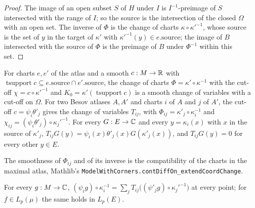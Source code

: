\begin{proof}
\leanok
The image of an open subset $S$ of $H$ under $I$ is $I^{-1}$-preimage of $S$ intersected with
the range of $I$; so the source is the intersection of the closed $\Omega$ with an open set. The
inverse of $\Phi$ is the change of charts $\kappa \circ \kappa'^{-1}$, whose source is the set of
$y$ in the target of $\kappa'$ with $\kappa'^{-1}(y) \in e.\mathrm{source}$; the image of $B$
intersected with the source of $\Phi$ is the preimage of $B$ under $\Phi^{-1}$ within this set.
\end{proof}

\begin{definition}
\label{def:chart-transition}
\leanok
{}
For charts $e, e'$ of the atlas and a smooth $c : M \to \mathbb{R}$ with $\operatorname{tsupport} c
\subseteq e.\mathrm{source} \cap e'.\mathrm{source}$, the change of charts
$\Phi = \kappa' \circ \kappa^{-1}$ with the cut-off $\chi = c \circ \kappa'^{-1}$ and
$K_0 = \kappa'(\operatorname{tsupport} c)$ is a smooth change of variables with a cut-off on
$\Omega$. For two Besov atlases $A, A'$ and charts $i$ of $A$ and $j$ of $A'$, the cut-off
$c = \psi_i \theta'_j$ gives the change of variables $T_{ij}$, with
$\Phi_{ij} = \kappa'_j \circ \kappa_i^{-1}$ and $\chi_{ij} = (\psi_i \theta'_j) \circ
\kappa_j'^{-1}$. For every $G : E \to \mathbb{C}$ and every $y = \kappa_i(x)$ with $x$ in the source of
$\kappa'_j$, $T_{ij} G(y) = \psi_i(x) \theta'_j(x) G(\kappa'_j(x))$, and $T_{ij} G(y) = 0$ for
every other $y \in E$.
\end{definition}

The smoothness of $\Phi_{ij}$ and of its inverse is the compatibility of the charts in the
maximal atlas, Mathlib's
\texttt{ModelWithCorners.\allowbreak contDiffOn\_\allowbreak extendCoordChange}.

\begin{theorem}
\label{thm:pieces-two-atlases}
\leanok
{}
For every $g : M \to \mathbb{C}$, $(\psi_i g) \circ \kappa_i^{-1} = \sum_j T_{ij}\bigl((\psi'_j g) \circ
\kappa_j'^{-1}\bigr)$ at every point; for $f \in L_p(\mu)$ the same holds in $L_p(E)$.
\end{theorem}

